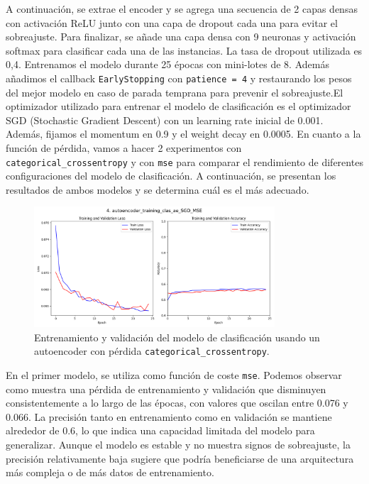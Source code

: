 A continuación, se extrae el encoder y se agrega una secuencia de 2 capas densas con activación ReLU junto con una capa de dropout cada una para evitar el sobreajuste. Para finalizar, se añade una capa densa con 9 neuronas y activación softmax para clasificar cada una de las instancias. La tasa de dropout utilizada es 0,4. Entrenamos el modelo durante 25 épocas con mini-lotes de 8. Además añadimos el callback \lstinline|EarlyStopping| con \lstinline|patience = 4| y restaurando los pesos del mejor modelo en caso de parada temprana para prevenir el sobreajuste.El optimizador utilizado para entrenar el modelo de clasificación es el optimizador SGD (Stochastic Gradient Descent) con un learning rate inicial de 0.001. Además, fijamos el momentum en 0.9 y el weight decay en 0.0005. En cuanto a la función de pérdida, vamos a hacer 2 experimentos con \lstinline|categorical_crossentropy| y con \lstinline|mse| para comparar el rendimiento de diferentes configuraciones del modelo de clasificación. A continuación, se presentan los resultados de ambos modelos y se determina cuál es el más adecuado.


\begin{figure}[H]
    \centering
    \includegraphics[width=0.8\textwidth]{img/aeMMC_sgd_mse.png}
    \caption{Entrenamiento y validación del modelo de clasificación usando un autoencoder con pérdida \lstinline|categorical_crossentropy|.}
    \label{fig:ae_sgd_mse}
\end{figure}

En el primer modelo, se utiliza como función de coste \lstinline|mse|. Podemos observar como muestra una pérdida de entrenamiento y validación que disminuyen consistentemente a lo largo de las épocas, con valores que oscilan entre 0.076 y 0.066. La precisión tanto en entrenamiento como en validación se mantiene alrededor de 0.6, lo que indica una capacidad limitada del modelo para generalizar. Aunque el modelo es estable y no muestra signos de sobreajuste, la precisión relativamente baja sugiere que podría beneficiarse de una arquitectura más compleja o de más datos de entrenamiento.

